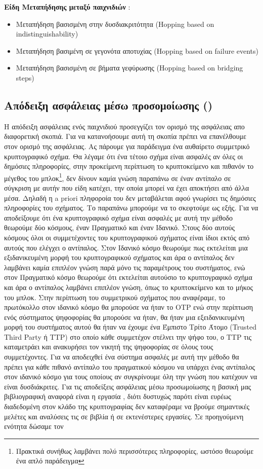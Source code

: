 \textbf{Είδη Μεταπήδησης μεταξύ παιχνιδιών} :
\begin{itemize}
    \item Μεταπήδηση βασισμένη στην δυσδιακριτότητα (Hopping based on indistinguishability)
    \item Μεταπήδηση βασιμένη σε γεγονότα αποτυχίας (Hopping based on failure events)
    \item Μεταπήδηση βασισμένη σε βήματα γεφύρωσης (Hopping based on bridging steps)
\end{itemize}


\subsection{Απόδειξη ασφάλειας μέσω προσομοίωσης ()}
Η απόδειξη ασφάλειας ενός παιχνιδιού προσεγγίζει τον ορισμό της ασφάλειας απο διαφορετική σκοπιά. Για να κατανοήσουμε αυτή τη σκοπία πρέπει να επανέλθουμε στον ορισμό της ασφάλειας. Ας πάρουμε για παράδειγμα ένα αυθαίρετο συμμετρικό κρυπτογραφικό σχήμα. Θα λέγαμε ότι ένα τέτοιο σχήμα είναι ασφαλές αν όλες οι δημόσιες πληροφορίες, στην προκείμενη περίπτωση το κρυπτοκείμενο και πιθανόν το μέγεθος του μπλοκ\footnote{Πρακτικά συνήθως λαμβάνει πολύ περισσότερες πληροφορίες, ωστόσο θεωρούμε ένα απλό παράδειγμα}, δεν δίνουν καμία γνώση παραπάνω σε έναν αντίπαλο σε σύγκριση με αυτήν που είδη κατέχει, την οποία μπορεί να έχει αποκτήσει από άλλα μέσα. Δηλαδή η a priori πληφοροία του δεν μεταβάλεται αφού γνωρίσει τις δημόσιες πληροφορίες του σχήματος. Το παραπάνω μπορούμε να το σκεφτούμε ως εξής. Για να αποδείξουμε ότι ένα κρυπτογραφικό σχήμα είναι ασφαλές με αυτή την μέθοδο θεωρούμε δύο κόσμους, έναν Πραγματικό και έναν Ιδανικό. Στους δύο αυτούς κόσμους όλοι οι συμμετέχοντες του κρυπτογραφικού σχήματος είναι ίδιοι εκτός από αυτούς που ελέγχει ο αντίπαλος. Στον Ιδανικό κόσμο θεωρούμε πως εκτελείται μια εξιδανικευμένη μορφή του κρυπτογραφικού σχήματος και άρα ο αντίπαλος δεν λαμβάνει καμία επιπλέον γνώση παρά μόνο τις παραμέτρους του συστήματος, ενώ στον Πραγματικό κόσμο θεωρούμε ότι εκτελείται αυτούσιο το κρυπτογραφικό σχήμα και άρα ο αντίπαλος λαμβάνει επιπλέον γνώση, όπως το κρυπτοκείμενο και το μήκος του μπλοκ. Στην περίπτωση του συμμετρικού σχήματος που αναφέραμε, το πρωτόκολλο στον ιδανικό κόσμο θα μπορούσε να ήταν το OTP ενώ στην περίπτωση ενός σύστηματος ψηφοφορίας θα μπορούσε να ήταν, θα ήταν μια εξειδανικευμένη μορφή του συστήματος αυτού θα ήταν να έχουμε ένα Έμπιστο Τρίτο Άτομο (Trusted Third Party ή TTP) στο οποίο κάθε συμμετέχον στέλνει την ψήφο του, ο TTP τις καταμετράει και ανακυρήσει τον νικητή της ψηφοφορίας σε όλους τους συμμετέχοντες. Για να αποδειχθεί ένα σύστημα ασφαλές με αυτή την μέθοδο θα πρέπει για κάθε πιθανό αντίπαλο του πραγματικού κόσμου να υπάρχει ένας αντίπαλος στον ιδανικό κόσμο για τους οποίους αν συγκρίνουμε όλη την γνώση που κατέχουν να είναι δυσδιάκριτες. Για τις αποδείξεις ασφάλειας μέσω προσωμοίωσης η βασική μας βιβλιογραφική αναφορά είναι η εργασία \cite{cryptoeprint:2016/046}, διότι δυστυχώς παρότι είναι ευρέως διαδεδομένη στον κλάδο της κρυπτογραφίας δεν καταφέραμε να βρούμε σημαντικές μελέτες και αναλύσεις τις σε βιβλία ή σε εκτενέστερες εργασίες. Σε προηγούμενη ενότητα δώσαμε τον 